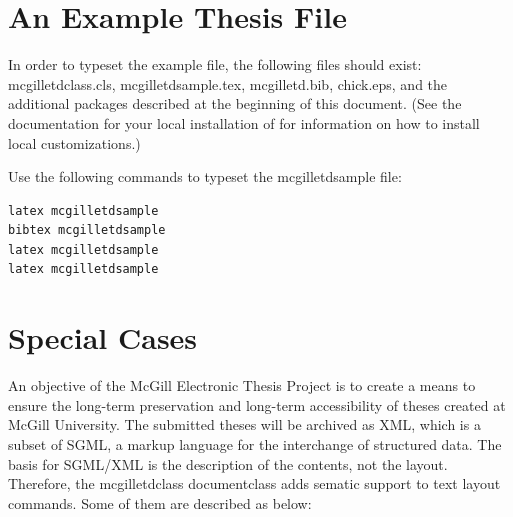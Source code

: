 \documentclass[12pt,Bold,letterpaper,TexShade]{mcgilletdclass}
\numberwithin{equation}{section}
\begin{document}
\section{An Example Thesis File}
In order to typeset the example file, the following files should exist:
mcgilletdclass.cls, mcgilletdsample.tex, mcgilletd.bib, chick.eps, and the additional
packages described at the beginning of this document.  (See the documentation
for your local installation of \LaTeXe for information on how to install
local customizations.)

Use the following commands to typeset the mcgilletdsample file:

\begin{verbatim}
latex mcgilletdsample
bibtex mcgilletdsample
latex mcgilletdsample
latex mcgilletdsample
\end{verbatim}

\section{Special Cases}
An objective of the McGill Electronic Thesis Project is to create a means to 
ensure the long-term preservation and long-term accessibility of theses created 
at McGill University. The submitted theses will be archived as XML, which is a 
subset of SGML, a markup language for the interchange of structured data.  
The basis for SGML/XML is the description of the contents, not the layout.  Therefore,
the mcgilletdclass documentclass adds sematic support to text layout commands. Some of them
are described as below:
\end{document}
